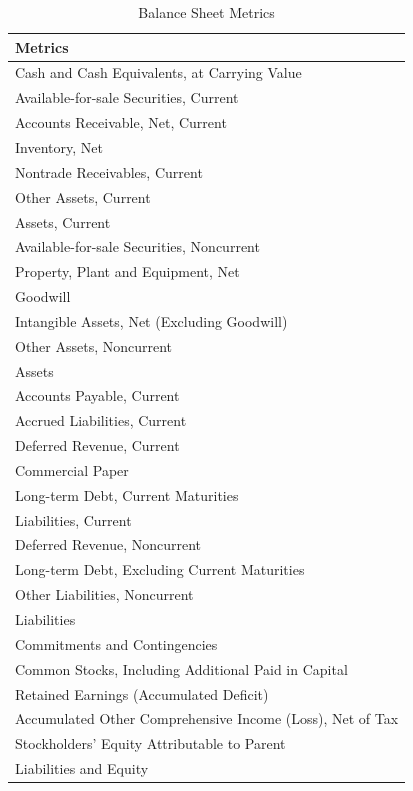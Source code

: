 \documentclass[]{book}
\theoremstyle{definition}
\theoremstyle{definition}
\theoremstyle{definition}
\theoremstyle{remark}
\begin{document}
\begin{table}[t]

\caption{\label{tab:unnamed-chunk-29}Balance Sheet Metrics}
\centering
\begin{tabular}{l}
\toprule
Metrics\\
\midrule
Cash and Cash Equivalents, at Carrying Value\\
Available-for-sale Securities, Current\\
Accounts Receivable, Net, Current\\
Inventory, Net\\
Nontrade Receivables, Current\\
\addlinespace
Other Assets, Current\\
Assets, Current\\
Available-for-sale Securities, Noncurrent\\
Property, Plant and Equipment, Net\\
Goodwill\\
\addlinespace
Intangible Assets, Net (Excluding Goodwill)\\
Other Assets, Noncurrent\\
Assets\\
Accounts Payable, Current\\
Accrued Liabilities, Current\\
\addlinespace
Deferred Revenue, Current\\
Commercial Paper\\
Long-term Debt, Current Maturities\\
Liabilities, Current\\
Deferred Revenue, Noncurrent\\
\addlinespace
Long-term Debt, Excluding Current Maturities\\
Other Liabilities, Noncurrent\\
Liabilities\\
Commitments and Contingencies\\
Common Stocks, Including Additional Paid in Capital\\
\addlinespace
Retained Earnings (Accumulated Deficit)\\
Accumulated Other Comprehensive Income (Loss), Net of Tax\\
Stockholders' Equity Attributable to Parent\\
Liabilities and Equity\\
\bottomrule
\end{tabular}
\end{table}
\end{document}
